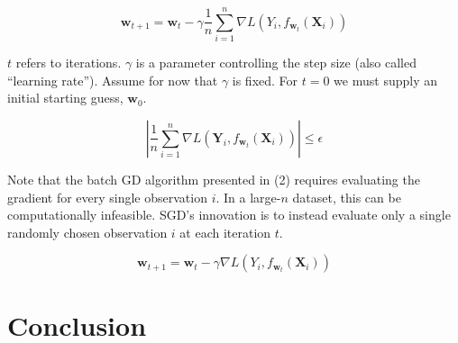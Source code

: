 \documentclass{article}
\begin{document}
\begin{equation}
	\bm{w}_{t+1} = \bm{w}_t - \gamma \frac{1}{n}\sum_{i=1}^n
	\nabla L(Y_i, f_{\bm{w}_t}(\bm{X}_i))
\end{equation}

$t$ refers to iterations. $\gamma$ is a parameter controlling the step
size (also called ``learning rate''). Assume for now that $\gamma$ is fixed. For
$t=0$ we must supply an initial starting guess, $\bm{w}_0$.  

\begin{equation}
	\left|\frac{1}{n}\sum_{i=1}^n \nabla L(\bm{Y}_i,
	f_{\bm{w}_t}(\bm{X}_i))\right| \leq \epsilon
\end{equation}

Note that the batch GD algorithm presented in (2) requires evaluating the
gradient for every single observation $i$. In a large-$n$ dataset, this can be
computationally infeasible. SGD's innovation is to instead evaluate only a
single randomly chosen observation $i$ at each iteration $t$.

\begin{equation}
	\bm{w}_{t+1} = \bm{w}_t - \gamma 
	\nabla L(Y_i, f_{\bm{w}_t}(\bm{X}_i))
\end{equation}
\section{Conclusion}

\printbibliography
\end{document}
